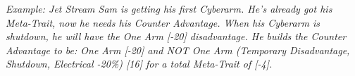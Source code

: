 \begin{multicols*}{3}
	\textit{\textcolor{OliveGreen}{Example: Jet Stream Sam is getting his first Cyberarm. He's already got his Meta-Trait, now he needs his Counter Advantage. When his Cyberarm is shutdown, he will have the One Arm [-20] disadvantage. He builds the Counter Advantage to be: One Arm [-20] and NOT One Arm (Temporary Disadvantage, Shutdown, Electrical -20\%) [16] for a total Meta-Trait of [-4].}}
	
%	
%	
%	
%	
%	
	

\end{multicols*}
